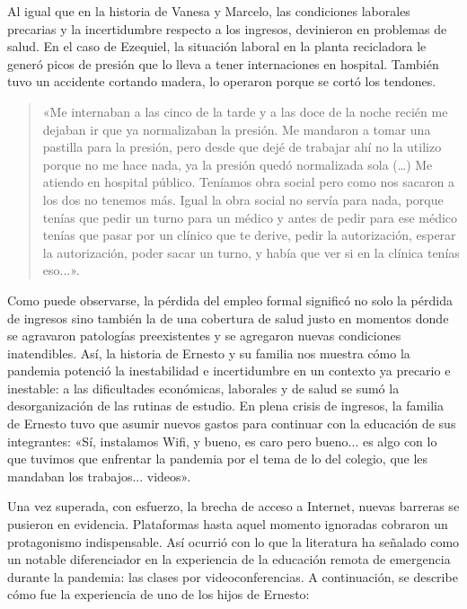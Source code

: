 Al igual que en la historia de Vanesa y Marcelo, las condiciones laborales precarias y la incertidumbre respecto a los ingresos, devinieron en problemas de salud. En el caso de Ezequiel, la situación laboral en la planta recicladora le generó picos de presión que lo lleva a tener internaciones en hospital. También tuvo un accidente cortando madera, lo operaron porque se cortó los tendones.

\begin{quote}
«Me internaban a las cinco de la tarde y a las doce de la noche recién me dejaban ir que ya normalizaban la presión. Me mandaron a tomar una pastilla para la presión, pero desde que dejé de trabajar ahí no la utilizo porque no me hace nada, ya la presión quedó normalizada sola (\ldots) Me atiendo en hospital público. Teníamos obra social pero como nos sacaron a los dos no tenemos más. Igual la obra social no servía para nada, porque tenías que pedir un turno para un médico y antes de pedir para ese médico tenías que pasar por un clínico que te derive, pedir la autorización, esperar la autorización, poder sacar un turno, y había que ver si en la clínica tenías eso...».
\end{quote}

Como puede observarse, la pérdida del empleo formal significó no solo la pérdida de ingresos sino también la de una cobertura de salud justo en momentos donde se agravaron patologías preexistentes y se agregaron nuevas condiciones inatendibles. Así, la historia de Ernesto y su familia nos muestra cómo la pandemia potenció la inestabilidad e incertidumbre en un contexto ya precario e inestable: a las dificultades económicas, laborales y de salud se sumó la desorganización de las rutinas de estudio. En plena crisis de ingresos, la familia de Ernesto tuvo que asumir nuevos gastos para continuar con la educación de sus integrantes: «Sí, instalamos Wifi, y bueno, es caro pero bueno... es algo con lo que tuvimos que enfrentar la pandemia por el tema de lo del colegio, que les mandaban los trabajos... videos».

Una vez superada, con esfuerzo, la brecha de acceso a Internet, nuevas barreras se pusieron en evidencia. Plataformas hasta aquel momento ignoradas cobraron un protagonismo indispensable. Así ocurrió con lo que la literatura ha señalado como un notable diferenciador en la experiencia de la educación remota de emergencia durante la pandemia: las clases por videoconferencias. A continuación, se describe cómo fue la experiencia de uno de los hijos de Ernesto:

